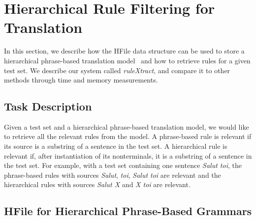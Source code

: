 \section{Hierarchical Rule Filtering for Translation}
\label{sec:rulextract}

In this section, we describe how the HFile data structure can be used
to store a hierarchical phrase-based translation model~\citep{chiang:2007:CL}
and how to retrieve rules for a given test set. We describe our system called
\emph{ruleXtract}, and compare it to other methods through time and memory
measurements.

\subsection{Task Description}

Given a test set and a hierarchical phrase-based translation model, we would
like to retrieve all the relevant rules from the model. A phrase-based rule is
relevant if its source is a substring of a sentence in the test set. A
hierarchical rule is relevant if, after instantiation of its nonterminals, it is
a substring of a sentence in the test set. For example, with a test set
containing one sentence \emph{Salut toi}, the phrase-based rules with sources
\emph{Salut}, \emph{toi}, \emph{Salut toi} are relevant and the hierarchical
rules with sources \emph{Salut X} and \emph{X toi} are relevant.

\subsection{HFile for Hierarchical Phrase-Based Grammars}

